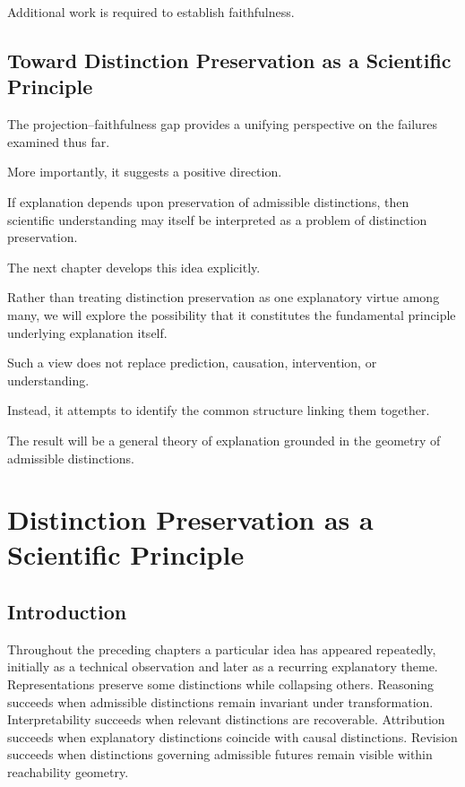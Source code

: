 \documentclass[11pt,oneside,openany]{book}
\begin{document}
Additional work is required to establish faithfulness.

\section{Toward Distinction Preservation as a Scientific Principle}

The projection--faithfulness gap provides a unifying perspective on the failures examined thus far.

More importantly, it suggests a positive direction.

If explanation depends upon preservation of admissible distinctions, then scientific understanding may itself be interpreted as a problem of distinction preservation.

The next chapter develops this idea explicitly.

Rather than treating distinction preservation as one explanatory virtue among many, we will explore the possibility that it constitutes the fundamental principle underlying explanation itself.

Such a view does not replace prediction, causation, intervention, or understanding.

Instead, it attempts to identify the common structure linking them together.

The result will be a general theory of explanation grounded in the geometry of admissible distinctions.

\chapter{Distinction Preservation as a Scientific Principle}

\section{Introduction}

Throughout the preceding chapters a particular idea has appeared repeatedly, initially as a technical observation and later as a recurring explanatory theme. Representations preserve some distinctions while collapsing others. Reasoning succeeds when admissible distinctions remain invariant under transformation. Interpretability succeeds when relevant distinctions are recoverable. Attribution succeeds when explanatory distinctions coincide with causal distinctions. Revision succeeds when distinctions governing admissible futures remain visible within reachability geometry.
\end{document}
